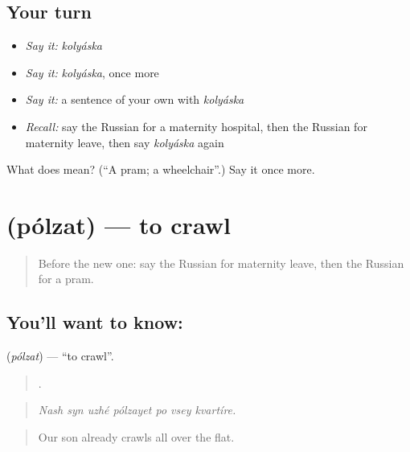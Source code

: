 \subsection*{Your turn}
\begin{itemize}
\raggedright
  \item \emph{Say it:} \emph{kolyáska}
  \item \emph{Say it:} \emph{kolyáska}, once more
  \item \emph{Say it:} a sentence of your own with \emph{kolyáska}
  \item \emph{Recall:} say the Russian for a maternity hospital, then the Russian for maternity leave, then say \emph{kolyáska} again
\end{itemize}

\begin{tcolorbox}[breakable,colback=teal!4,colframe=teal!35!black,title={Before you move on}]
What does  mean? (\textquotedblleft{}A pram; a wheelchair\textquotedblright{}.) Say it once more.
\end{tcolorbox}
\section[\texorpdfstring{\ru{ползать} (pólzat)}{ползать (pólzat)}]{ (pólzat) — to crawl}

\label{lesson:RU-C495-polzat}



\begin{quote}
Before the new one: say the Russian for maternity leave, then the Russian for a pram.
\end{quote}

\subsection*{You'll want to know: }
\textbf{} (\emph{pólzat}) — \textquotedblleft{}to crawl\textquotedblright{}.

\begin{quote}
      .
\end{quote}

\begin{quote}
\emph{Nash syn uzhé pólzayet po vsey kvartíre.}
\end{quote}

\begin{quote}
Our son already crawls all over the flat.
\end{quote}

